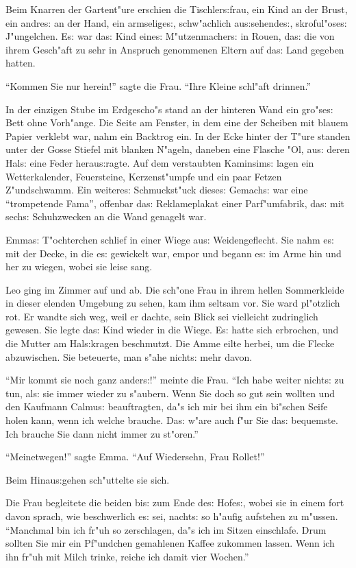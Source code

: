 \documentclass[oneside,12pt]{book}
\newcommand{\s}{s:}%
\begin{document}
Beim Knarren der Gartent"ure erschien die Tischler{\s}frau, ein
Kind an der Brust, ein andre{\s} an der Hand, ein armselige{\s},
schw"achlich au{\s}sehende{\s}, skroful"ose{\s} J"ungelchen. E{\s}
war da{\s} Kind eine{\s} M"utzenmacher{\s} in Rouen, da{\s} die
von ihrem Gesch"aft zu sehr in Anspruch genommenen Eltern auf
da{\s} Land gegeben hatten.

"`Kommen Sie nur herein!"' sagte die Frau. "`Ihre Kleine schl"aft
drinnen."'

In der einzigen Stube im Erdgescho"s stand an der hinteren Wand
ein gro"se{\s} Bett ohne Vorh"ange. Die Seite am Fenster, in dem
eine der Scheiben mit blauem Papier verklebt war, nahm ein
Backtrog ein. In der Ecke hinter der T"ure standen unter der Gosse
Stiefel mit blanken N"ageln, daneben eine Flasche "Ol, au{\s}
deren Hal{\s} eine Feder herau{\s}ragte. Auf dem verstaubten
Kaminsim{\s} lagen ein Wetterkalender, Feuersteine, Kerzenst"umpfe
und ein paar Fetzen Z"undschwamm. Ein weitere{\s} Schmuckst"uck
diese{\s} Gemach{\s} war eine "`trompetende Fama"', offenbar
da{\s} Reklameplakat einer Parf"umfabrik, da{\s} mit sech{\s}
Schuhzwecken an die Wand genagelt war.

Emma{\s} T"ochterchen schlief in einer Wiege au{\s}
Weidengeflecht. Sie nahm e{\s} mit der Decke, in die e{\s}
gewickelt war, empor und begann e{\s} im Arme hin und her zu
wiegen, wobei sie leise sang.

Leo ging im Zimmer auf und ab. Die sch"one Frau in ihrem hellen
Sommerkleide in dieser elenden Umgebung zu sehen, kam ihm seltsam
vor. Sie ward pl"otzlich rot. Er wandte sich weg, weil er dachte,
sein Blick sei vielleicht zudringlich gewesen. Sie legte da{\s}
Kind wieder in die Wiege. E{\s} hatte sich erbrochen, und die
Mutter am Hal{\s}kragen beschmutzt. Die Amme eilte herbei, um die
Flecke abzuwischen. Sie beteuerte, man s"ahe nicht{\s} mehr davon.

"`Mir kommt sie noch ganz ander{\s}!"' meinte die Frau. "`Ich habe
weiter nicht{\s} zu tun, al{\s} sie immer wieder zu s"aubern. Wenn
Sie doch so gut sein wollten und den Kaufmann Calmu{\s}
beauftragten, da"s ich mir bei ihm ein bi"schen Seife holen kann,
wenn ich welche brauche. Da{\s} w"are auch f"ur Sie da{\s}
bequemste. Ich brauche Sie dann nicht immer zu st"oren."'

"`Meinetwegen!"' sagte Emma. "`Auf Wiedersehn, Frau Rollet!"'

Beim Hinau{\s}gehen sch"uttelte sie sich.

Die Frau begleitete die beiden bi{\s} zum Ende de{\s} Hofe{\s},
wobei sie in einem fort davon sprach, wie beschwerlich e{\s} sei,
nacht{\s} so h"aufig aufstehen zu m"ussen. "`Manchmal bin ich
fr"uh so zerschlagen, da"s ich im Sitzen einschlafe. Drum sollten
Sie mir ein Pf"undchen gemahlenen Kaffee zukommen lassen. Wenn ich
ihn fr"uh mit Milch trinke, reiche ich damit vier Wochen."'
\end{document}
